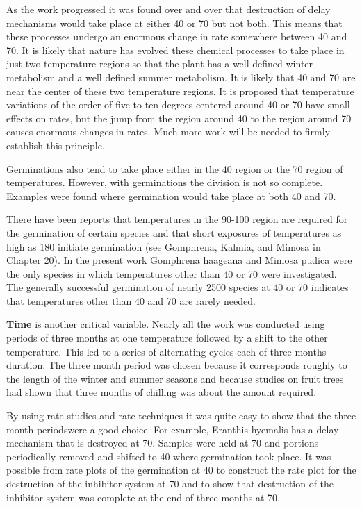As the work progressed it was found over and over that destruction of delay
mechanisms would take place at either 40 or 70 but not both. This means that these
processes undergo an enormous change in rate somewhere between 40 and 70. It is
likely that nature has evolved these chemical processes to take place in just two
temperature regions so that the plant has a well defined winter metabolism and a well
defined summer metabolism. It is likely that 40 and 70 are near the center of these two
temperature regions. It is proposed that temperature variations of the order of five to
ten degrees centered around 40 or 70 have small effects on rates, but the jump from
the region around 40 to the region around 70 causes enormous changes in rates.
Much more work will be needed to firmly establish this principle.

Germinations also tend to take place either in the 40 region or the 70 region of
temperatures. However, with germinations the division is not so complete. Examples
were found where germination would take place at both 40 and 70.

There have been reports that temperatures in the 90-100 region are required for
the germination of certain species and that short exposures of temperatures as high as
180 initiate germination (see Gomphrena, Kalmia, and Mimosa in Chapter 20). In the
present work Gomphrena haageana and Mimosa pudica were the only species in
which temperatures other than 40 or 70 were investigated. The generally successful
germination of nearly 2500 species at 40 or 70 indicates that temperatures other than
40 and 70 are rarely needed.

\textbf{Time} is another critical variable. Nearly all the work was conducted using
periods of three months at one temperature followed by a shift to the other
temperature. This led to a series of alternating cycles each of three months duration.
The three month period was chosen because it corresponds roughly to the length of
the winter and summer seasons and because studies on fruit trees had shown that
three months of chilling was about the amount required.

By using rate studies and rate techniques it was quite easy to show that the
three month periodswere a good choice. For example, Eranthis hyemalis has a delay
mechanism that is destroyed at 70. Samples were held at 70 and portions periodically
removed and shifted to 40 where germination took place. It was possible from rate
plots of the germination at 40 to construct the rate plot for the destruction of the
inhibitor system at 70 and to show that destruction of the inhibitor system was
complete at the end of three months at 70.

